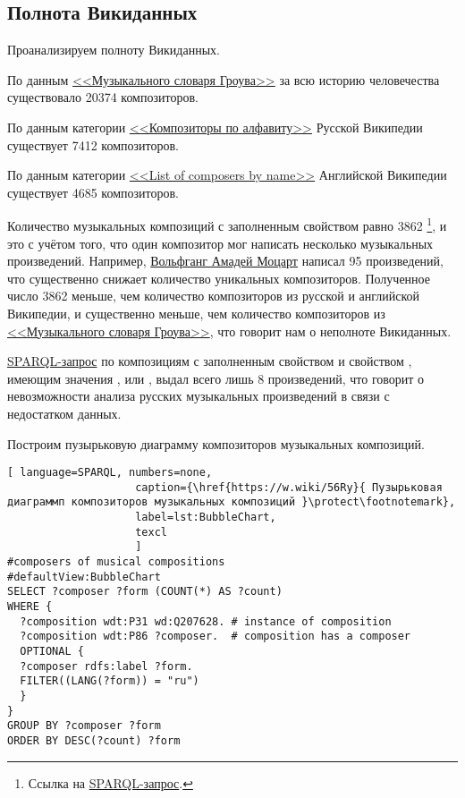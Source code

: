 \subsection{Полнота Викиданных}
Проанализируем полноту Викиданных.

По данным \href{https://ru.wikipedia.org/wiki/Музыкальный_словарь_Гроува}{<<Музыкального словаря Гроува>>} за всю историю человечества существовало \num{20374} композиторов.

По данным категории \href{https://ru.wikipedia.org/wiki/Категория:Композиторы_по_алфавиту}{<<Композиторы по алфавиту>>} Русской Википедии существует \num{7412} композиторов.

По данным категории \href{https://en.wikipedia.org/wiki/List_of_composers_by_name}{<<List of composers by name>>} Английской Википедии существует \num{4685} композиторов.

Количество музыкальных композиций с заполненным свойством  равно \num{3862} \footnote{ Ссылка на \href{https://w.wiki/56Rc}{SPARQL-запрос}.}, и это с учётом того, что один композитор мог написать несколько музыкальных произведений. Например, \href{https://ru.wikipedia.org/wiki/Моцарт,_Вольфганг_Амадей}{Вольфганг Амадей Моцарт} написал \num{95} произведений, что существенно снижает количество уникальных композиторов. Полученное число \num{3862} меньше, чем количество композиторов из русской и английской Википедии, и существенно меньше, чем количество композиторов из \href{https://ru.wikipedia.org/wiki/Музыкальный_словарь_Гроува}{<<Музыкального словаря Гроува>>}, что говорит нам о неполноте Викиданных.

\href{https://w.wiki/56Rj}{SPARQL-запрос} по композициям с заполненным свойством  и свойством , имеющим значения ,  или , выдал всего лишь \num{8} произведений, что говорит о невозможности анализа русских музыкальных произведений в связи с недостатком данных.

Построим пузырьковую диаграмму композиторов музыкальных композиций.

\begin{lstlisting}[ language=SPARQL, numbers=none,
                    caption={\href{https://w.wiki/56Ry}{ Пузырьковая диаграммп композиторов музыкальных композиций }\protect\footnotemark},
                    label=lst:BubbleChart,
                    texcl 
                    ]
#composers of musical compositions
#defaultView:BubbleChart
SELECT ?composer ?form (COUNT(*) AS ?count) 
WHERE {
  ?composition wdt:P31 wd:Q207628. # instance of composition
  ?composition wdt:P86 ?composer.  # composition has a composer
  OPTIONAL {
  ?composer rdfs:label ?form.  
  FILTER((LANG(?form)) = "ru")
  }
}
GROUP BY ?composer ?form
ORDER BY DESC(?count) ?form
\end{lstlisting}%

